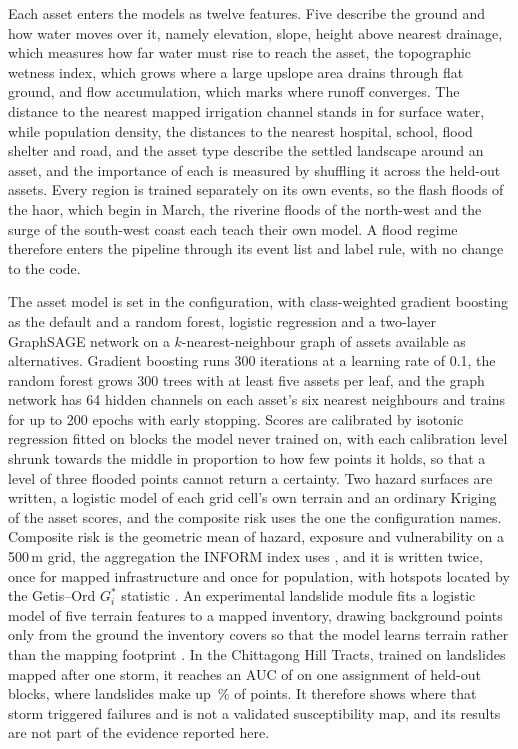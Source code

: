 \documentclass[preprint,12pt]{elsarticle}
\begin{document}
Each asset enters the models as twelve features. Five describe the ground and how water moves over it, namely elevation, slope, height above nearest drainage, which measures how far water must rise to reach the asset, the topographic wetness index, which grows where a large upslope area drains through flat ground, and flow accumulation, which marks where runoff converges. The distance to the nearest mapped irrigation channel stands in for surface water, while population density, the distances to the nearest hospital, school, flood shelter and road, and the asset type describe the settled landscape around an asset, and the importance of each is measured by shuffling it across the held-out assets. Every region is trained separately on its own events, so the flash floods of the haor, which begin in March, the riverine floods of the north-west and the surge of the south-west coast each teach their own model. A flood regime therefore enters the pipeline through its event list and label rule, with no change to the code.

The asset model is set in the configuration, with class-weighted gradient boosting as the default and a random forest, logistic regression and a two-layer GraphSAGE network \citep{hamilton2017} on a $k$-nearest-neighbour graph of assets available as alternatives. Gradient boosting runs 300 iterations at a learning rate of 0.1, the random forest grows 300 trees with at least five assets per leaf, and the graph network has 64 hidden channels on each asset's six nearest neighbours and trains for up to 200 epochs with early stopping. Scores are calibrated by isotonic regression \citep{zadrozny2002} fitted on blocks the model never trained on, with each calibration level shrunk towards the middle in proportion to how few points it holds, so that a level of three flooded points cannot return a certainty. Two hazard surfaces are written, a logistic model of each grid cell's own terrain and an ordinary Kriging of the asset scores, and the composite risk uses the one the configuration names. Composite risk is the geometric mean of hazard, exposure and vulnerability on a 500\,m grid, the aggregation the INFORM index uses \citep{inform2017}, and it is written twice, once for mapped infrastructure and once for population, with hotspots located by the Getis--Ord $G_i^*$ statistic \citep{getis1992}. An experimental landslide module fits a logistic model of five terrain features to a mapped inventory, drawing background points only from the ground the inventory covers so that the model learns terrain rather than the mapping footprint \citep{barbetmassin2012}. In the Chittagong Hill Tracts, trained on \CHTLandslides{} landslides mapped after one storm, it reaches an AUC of \CHTLSAUC{} on one assignment of held-out blocks, where landslides make up \CHTLSPositiveRate{}\,\% of points. It therefore shows where that storm triggered failures and is not a validated susceptibility map, and its results are not part of the evidence reported here.
\end{document}
